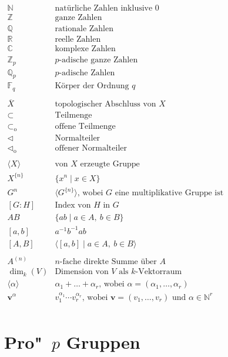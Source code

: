 \documentclass[11pt,a4paper,openany]{memoir}
\begin{document}
$\begin{array}{ll}
\mathbb{N} & \text{natürliche Zahlen inklusive $0$} \\
\mathbb{Z} & \text{ganze Zahlen}\\
\mathbb{Q} & \text{rationale Zahlen}\\
\mathbb{R} & \text{reelle Zahlen}\\
\mathbb{C} & \text{komplexe Zahlen}\\
\mathbb{Z}_p & \text{$p$-adische ganze Zahlen}\\
\mathbb{Q}_p & \text{$p$-adische Zahlen}\\
\mathbb{F}_q & \text{Körper der Ordnung $q$}\\
\\
\overline{X} & \text{topologischer Abschluss von $X$}\\
\subset & \text{Teilmenge}\\
\subset_\text{o}& \text{offene Teilmenge}\\
\lhd & \text{Normalteiler}\\
\lhd_\text{o}& \text{offener Normalteiler}\\
\\
\langle X\rangle & \text{von $X$ erzeugte Gruppe}\\
X^{\{n\}} & \{x^n\mid x\in X\}\\
G^n & \langle G^{\{n\}} \rangle\text{, wobei $G$ eine multiplikative Gruppe ist} \\
\left[G:H\right] & \text{Index von $H$ in $G$}\\
AB & \{ab\mid a\in A,\ b\in B\}\\
\left[a,b\right] & a^{-1}b^{-1}ab\\
\left[A,B\right] & \langle \left[a,b\right]\mid a\in A,\ b\in B\rangle\\
\\
A^{(n)} & \text{$n$-fache direkte Summe über $A$}\\
\dim_k(V) & \text{Dimension von $V$ als $k$-Vektorraum}\\
\langle\alpha\rangle & \alpha_1+\ldots+\alpha_r\text{, wobei }\alpha=(\alpha_1,\ldots,\alpha_r)\\
\mathbf{v}^\alpha & v_1^{\alpha_1}\cdots v_r^{\alpha_r}\text{, wobei $\mathbf{v}=(v_1,\ldots,v_r)$ und $\alpha\in\mathbb{N}^r$}\\
\end{array}$

\mainmatter
\setcounter{page}{9}

\chapter{Pro"~$p$ Gruppen}
\end{document}
